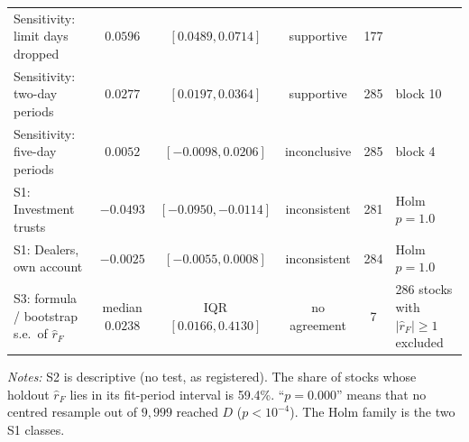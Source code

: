 \documentclass[12pt]{article}
\theoremstyle{definition}
\theoremstyle{remark}
\begin{document}
\begin{table}[!htbp]
{\begin{tabular}{@{}lccccl@{}}
Sensitivity: limit days dropped & $0.0596$ & $[0.0489, 0.0714]$ & supportive & 177 & \\
Sensitivity: two-day periods & $0.0277$ & $[0.0197, 0.0364]$ & supportive & 285 & block 10\\
Sensitivity: five-day periods & $0.0052$ & $[-0.0098, 0.0206]$ & inconclusive & 285 & block 4\\
S1: Investment trusts & $-0.0493$ & $[-0.0950, -0.0114]$ & inconsistent & 281 & Holm $p = 1.0$\\
S1: Dealers, own account & $-0.0025$ & $[-0.0055, 0.0008]$ & inconsistent & 284 & Holm $p = 1.0$\\
S3: formula / bootstrap s.e.\ of $\hat r_F$ & median $0.0238$ & IQR $[0.0166, 0.4130]$ & no agreement & 7 & 286 stocks with $|\hat r_F| \ge 1$ excluded\\
\bottomrule\end{tabular}}

\vspace{6pt}
\parbox{\linewidth}{\footnotesize\emph{Notes:} S2 is descriptive (no test, as registered). The share of stocks whose holdout $\hat r_F$ lies in its fit-period interval is 59.4\%. ``$p = 0.000$'' means that no centred resample out of $9{,}999$ reached $D$ ($p < 10^{-4}$). The Holm family is the two S1 classes.}
\end{table}
\end{document}

